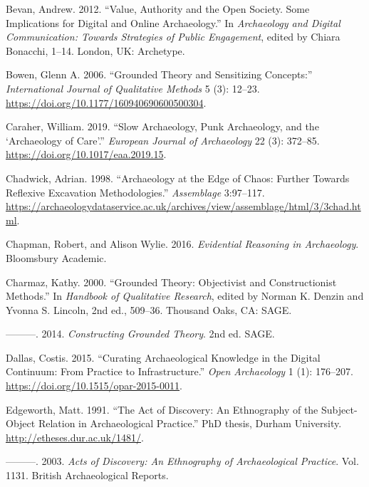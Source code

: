 \documentclass[
]{article}
\newlength{\cslhangindent}
\newenvironment{CSLReferences}[2] %
 {\begin{list}{}{%
  \setlength{\itemindent}{0pt}
  \setlength{\leftmargin}{0pt}
  \setlength{\parsep}{0pt}
  \ifodd #1
   \setlength{\leftmargin}{\cslhangindent}
   \setlength{\itemindent}{-1\cslhangindent}
  \fi
  \setlength{\itemsep}{#2\baselineskip}}}
 {\end{list}}
\begin{document}
\begin{CSLReferences}{1}{0}
Bevan, Andrew. 2012. {``Value, {Authority} and the {Open Society}. {Some
Implications} for {Digital} and {Online Archaeology}.''} In
\emph{Archaeology and {Digital Communication}: {Towards Strategies} of
{Public Engagement}}, edited by Chiara Bonacchi, 1--14. London, UK:
Archetype.

Bowen, Glenn A. 2006. {``Grounded {Theory} and {Sensitizing
Concepts}:''} \emph{International Journal of Qualitative Methods} 5 (3):
12--23. \url{https://doi.org/10.1177/160940690600500304}.

Caraher, William. 2019. {``Slow {Archaeology}, {Punk Archaeology}, and
the {`{Archaeology} of {Care}'}.''} \emph{European Journal of
Archaeology} 22 (3): 372--85. \url{https://doi.org/10.1017/eaa.2019.15}.

Chadwick, Adrian. 1998. {``Archaeology at the Edge of Chaos: Further
Towards Reflexive Excavation Methodologies.''} \emph{Assemblage}
3:97--117.
\url{https://archaeologydataservice.ac.uk/archives/view/assemblage/html/3/3chad.html}.

Chapman, Robert, and Alison Wylie. 2016. \emph{Evidential {Reasoning} in
{Archaeology}}. Bloomsbury Academic.

Charmaz, Kathy. 2000. {``Grounded {Theory}: {Objectivist} and
{Constructionist Methods}.''} In \emph{Handbook of {Qualitative
Research}}, edited by Norman K. Denzin and Yvonna S. Lincoln, 2nd ed.,
509--36. Thousand Oaks, CA: SAGE.

---------. 2014. \emph{Constructing {Grounded Theory}}. 2nd ed. SAGE.

Dallas, Costis. 2015. {``Curating {Archaeological Knowledge} in the
{Digital Continuum}: {From Practice} to {Infrastructure}.''} \emph{Open
Archaeology} 1 (1): 176--207.
\url{https://doi.org/10.1515/opar-2015-0011}.

Edgeworth, Matt. 1991. {``The Act of Discovery: {An} Ethnography of the
Subject-Object Relation in Archaeological Practice.''} PhD thesis,
Durham University. \url{http://etheses.dur.ac.uk/1481/}.

---------. 2003. \emph{Acts of Discovery: {An} Ethnography of
Archaeological Practice}. Vol. 1131. British Archaeological Reports.


\end{CSLReferences}
\end{document}

